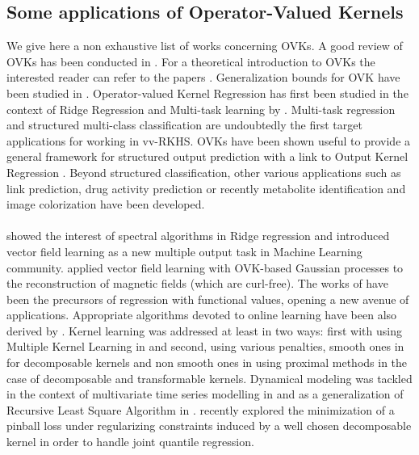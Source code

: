 \documentclass[twoside,11pt]{article}
\begin{document}
\subsection{Some applications of Operator-Valued Kernels}
We give here a non exhaustive list of works concerning \aclp{OVK}.  A good
review of \aclp{OVK} has been conducted in \citet{Alvarez2012}. For a
theoretical introduction to \acsp{OVK} the interested reader can refer to the
papers \citet{carmeli2006vector, caponnetto2008, Carmeli2010}. Generalization
bounds for \acs{OVK} have been studied in \citet{Sindhwani2013,
kadri2015operator,sangnier2016joint, maurer2016vector}.  Operator-valued Kernel
Regression has first been studied in the context of Ridge Regression and
Multi-task learning by \citet{Micchelli2005}.  Multi-task regression
\citep{micchelli2004kernels}  and structured multi-class classification
\citep{Dinuzzo2011,minh2013unifying,mroueh2012multiclass} are undoubtedly the
first target applications for working in \acl{vv-RKHS}.  \aclp{OVK} have been
shown useful to provide a general framework for structured output prediction
\citep{Brouard2011,Brouard2016_jmlr} with a link to Output Kernel Regression
\citep{Kadri_icml2013}. Beyond structured classification, other various
applications such as link prediction, drug activity prediction or recently
metabolite identification \citep{brouard2016fast} and  image colorization
\citep{ha2010image} have been developed.
\paragraph{}
\citet{Macedo2008, Baldassare2012} showed the interest of spectral algorithms
in Ridge regression and introduced vector field learning as a new multiple
output task in Machine Learning community. \citet{Wahlstrom2013} applied vector
field learning with \acs{OVK}-based Gaussian processes to the reconstruction of
magnetic fields (which are curl-free).  The works of
\citet{Kadri_aistat10,kadri2015operator} have been the precursors of regression
with functional values, opening a new avenue of applications.  Appropriate
algorithms devoted to online learning have been also derived  by
\citet{audiffren2013online}.  Kernel learning was addressed at least in two
ways: first with using Multiple Kernel Learning in \citet{Kadri_nips2012} and
second, using various penalties, smooth ones in \citet{Dinuzzo2011,
ciliberto2015} for decomposable kernels and non smooth ones in
\citet{lim2015operator} using proximal methods in the case of decomposable and
transformable kernels.  Dynamical modeling was tackled in the context of
multivariate time series modelling in
\citet{lim2013okvar,Sindhwani2013,lim2015operator} and as a generalization of
Recursive Least Square Algorithm in \citet{amblard2015operator}.
\citet{sangnier2016joint} recently explored the minimization of a pinball loss
under regularizing constraints induced by a well chosen decomposable kernel in
order to handle joint quantile regression.
\end{document}
